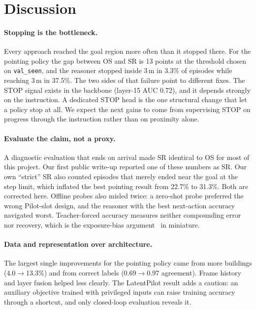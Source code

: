 \documentclass[11pt]{article}
\begin{document}
\section{Discussion}

\paragraph{Stopping is the bottleneck.}
Every approach reached the goal region more often than it stopped there. For the pointing policy the gap between OS
and SR is 13 points at the threshold chosen on \texttt{val\_seen}, and the reasoner stopped inside 3\,m in 3.3\% of
episodes while reaching 3\,m in 37.5\%. The two sides of that failure
point to different fixes. The STOP signal exists in the backbone (layer-15 AUC 0.72), and it depends strongly on the
instruction. A dedicated STOP head is the one structural change that let a policy stop at all. We expect the next gains
to come from supervising STOP on progress through the instruction rather than on proximity alone.

\paragraph{Evaluate the claim, not a proxy.}
A diagnostic evaluation that ends on arrival made SR identical to OS for most of this project. Our first public
write-up reported one of these numbers as SR. Our own ``strict'' SR also counted episodes that merely ended near the
goal at the step limit, which inflated the best pointing result from 22.7\% to 31.3\%. Both are corrected here. Offline probes also misled twice: a
zero-shot probe preferred the wrong Pilot-slot design, and the reasoner with the best next-action accuracy navigated
worst. Teacher-forced accuracy measures neither compounding error nor recovery, which is the exposure-bias
argument~\citep{bengio2015scheduled,ross2011dagger} in miniature.

\paragraph{Data and representation over architecture.}
The largest single improvements for the pointing policy came from more buildings (4.0$\to$13.3\%) and from correct
labels (0.69$\to$0.97 agreement). Frame history and layer fusion helped less clearly. The LatentPilot result adds a
caution: an auxiliary objective trained with privileged inputs can raise training accuracy through a shortcut, and
only closed-loop evaluation reveals it.
\end{document}
